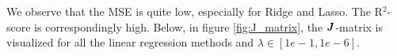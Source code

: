 We observe that the MSE is quite low, especially for Ridge and Lasso. The R$^2$-score is correspondingly high. Below, in figure \eqref{fig:J_matrix}, the $\boldsymbol{J}$-matrix is visualized for all the linear regression methods and $\lambda\in[1e-1,1e-6]$.

\begin{figure} [H]%
	\centering
	\\
	

\end{figure}

